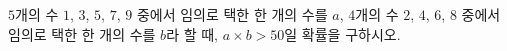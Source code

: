 $5$개의 수 $1$, $3$, $5$, $7$, $9$ 중에서 임의로 택한 한 개의 수를 $a$, $4$개의 수 $2$, $4$, $6$, $8$ 중에서 임의로 택한 한 개의 수를 $b$라 할 때, $a\times b>50$일 확률을 구하시오.
